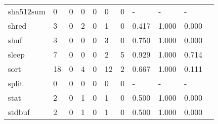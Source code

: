 \begin{longtable}{lp{1.10cm}p{1.10cm}p{1.10cm}p{1.10cm}p{1.10cm}p{1.10cm}p{1.10cm}p{1.10cm}p{1.10cm}p{1.10cm}}
sha512sum &                      0 &                                  0 &                                 0 &                                0 &                                 0 &                               0 &                              - &                                     - &                                   - \\
shred     &                      3 &                                  0 &                                 2 &                                0 &                                 1 &                               0 &                          0.417 &                                 1.000 &                               0.000 \\
shuf      &                      3 &                                  0 &                                 0 &                                0 &                                 3 &                               0 &                          0.750 &                                 1.000 &                               0.000 \\
sleep     &                      7 &                                  0 &                                 0 &                                0 &                                 2 &                               5 &                          0.929 &                                 1.000 &                               0.714 \\
sort      &                     18 &                                  0 &                                 4 &                                0 &                                12 &                               2 &                          0.667 &                                 1.000 &                               0.111 \\
split     &                      0 &                                  0 &                                 0 &                                0 &                                 0 &                               0 &                              - &                                     - &                                   - \\
stat      &                      2 &                                  0 &                                 1 &                                0 &                                 1 &                               0 &                          0.500 &                                 1.000 &                               0.000 \\
stdbuf    &                      2 &                                  0 &                                 1 &                                0 &                                 1 &                               0 &                          0.500 &                                 1.000 &                               0.000 \\

\end{longtable}
